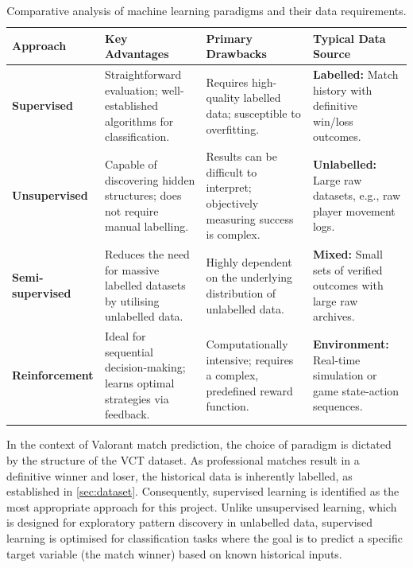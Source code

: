 \begin{table}[H]
    \centering
    \small
    \begin{tabularx}{\linewidth}{@{} l >{\raggedright\arraybackslash}X >{\raggedright\arraybackslash}X >{\raggedright\arraybackslash}p{3.5cm} @{} }
        \toprule
        \textbf{Approach} & \textbf{Key Advantages} & \textbf{Primary Drawbacks} & \textbf{Typical Data Source} \\ 
        \midrule

        \textbf{Supervised} & 
        Straightforward evaluation; well-established algorithms for classification. & 
        Requires high-quality labelled data; susceptible to overfitting. & 
        \textbf{Labelled:} Match history with definitive win/loss outcomes. \\
        \addlinespace

        \midrule
        \textbf{Unsupervised} & 
        Capable of discovering hidden structures; does not require manual labelling. & 
        Results can be difficult to interpret; objectively measuring success is complex. & 
        \textbf{Unlabelled:} Large raw datasets, e.g., raw player movement logs. \\
        \addlinespace

        \midrule
        \textbf{Semi-supervised} & 
        Reduces the need for massive labelled datasets by utilising unlabelled data. & 
        Highly dependent on the underlying distribution of unlabelled data. & 
        \textbf{Mixed:} Small sets of verified outcomes with large raw archives. \\
        \addlinespace

        \midrule
        \textbf{Reinforcement} & 
        Ideal for sequential decision-making; learns optimal strategies via feedback. & 
        Computationally intensive; requires a complex, predefined reward function. & 
        \textbf{Environment:} Real-time simulation or game state-action sequences. \\
        \bottomrule
    \end{tabularx}
    \caption{Comparative analysis of machine learning paradigms and their data requirements.}
    \label{tab:MLProsAndCons}
\end{table}

In the context of Valorant match prediction, the choice of paradigm is dictated by the structure of the VCT dataset. As professional matches result in a definitive winner and loser, the historical data is inherently labelled, as established in \autoref{sec:dataset}. Consequently, supervised learning is identified as the most appropriate approach for this project. Unlike unsupervised learning, which is designed for exploratory pattern discovery in unlabelled data, supervised learning is optimised for classification tasks where the goal is to predict a specific target variable (the match winner) based on known historical inputs.

